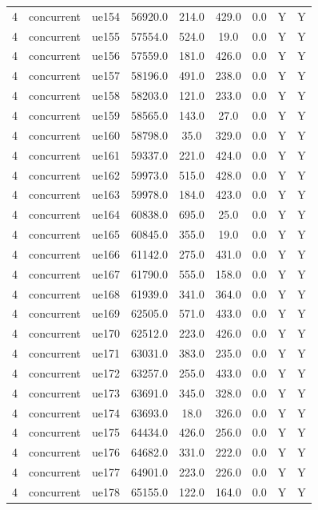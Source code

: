 \begin{table}[ht]
\begin{tabular}{|c|c|c|c|c|c|c|c|c|}
4 & concurrent & ue154 & 56920.0 & 214.0 & 429.0 & 0.0 & Y & Y \\
4 & concurrent & ue155 & 57554.0 & 524.0 & 19.0 & 0.0 & Y & Y \\
4 & concurrent & ue156 & 57559.0 & 181.0 & 426.0 & 0.0 & Y & Y \\
4 & concurrent & ue157 & 58196.0 & 491.0 & 238.0 & 0.0 & Y & Y \\
4 & concurrent & ue158 & 58203.0 & 121.0 & 233.0 & 0.0 & Y & Y \\
4 & concurrent & ue159 & 58565.0 & 143.0 & 27.0 & 0.0 & Y & Y \\
4 & concurrent & ue160 & 58798.0 & 35.0 & 329.0 & 0.0 & Y & Y \\
4 & concurrent & ue161 & 59337.0 & 221.0 & 424.0 & 0.0 & Y & Y \\
4 & concurrent & ue162 & 59973.0 & 515.0 & 428.0 & 0.0 & Y & Y \\
4 & concurrent & ue163 & 59978.0 & 184.0 & 423.0 & 0.0 & Y & Y \\
4 & concurrent & ue164 & 60838.0 & 695.0 & 25.0 & 0.0 & Y & Y \\
4 & concurrent & ue165 & 60845.0 & 355.0 & 19.0 & 0.0 & Y & Y \\
4 & concurrent & ue166 & 61142.0 & 275.0 & 431.0 & 0.0 & Y & Y \\
4 & concurrent & ue167 & 61790.0 & 555.0 & 158.0 & 0.0 & Y & Y \\
4 & concurrent & ue168 & 61939.0 & 341.0 & 364.0 & 0.0 & Y & Y \\
4 & concurrent & ue169 & 62505.0 & 571.0 & 433.0 & 0.0 & Y & Y \\
4 & concurrent & ue170 & 62512.0 & 223.0 & 426.0 & 0.0 & Y & Y \\
4 & concurrent & ue171 & 63031.0 & 383.0 & 235.0 & 0.0 & Y & Y \\
4 & concurrent & ue172 & 63257.0 & 255.0 & 433.0 & 0.0 & Y & Y \\
4 & concurrent & ue173 & 63691.0 & 345.0 & 328.0 & 0.0 & Y & Y \\
4 & concurrent & ue174 & 63693.0 & 18.0 & 326.0 & 0.0 & Y & Y \\
4 & concurrent & ue175 & 64434.0 & 426.0 & 256.0 & 0.0 & Y & Y \\
4 & concurrent & ue176 & 64682.0 & 331.0 & 222.0 & 0.0 & Y & Y \\
4 & concurrent & ue177 & 64901.0 & 223.0 & 226.0 & 0.0 & Y & Y \\
4 & concurrent & ue178 & 65155.0 & 122.0 & 164.0 & 0.0 & Y & Y \\

\end{tabular}
\end{table}
